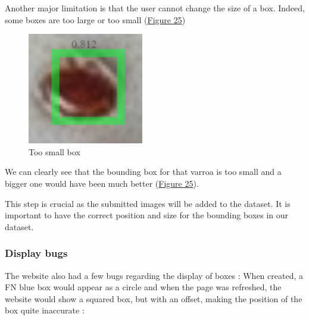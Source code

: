 \documentclass{article}
\begin{document}
Another major limitation is that the user cannot change the size of a box. Indeed, some boxes are too large or too small (\hyperref[Figure 25]{Figure 25})

\begin{figure}[!ht]
  \centering
  \includegraphics[scale=0.9]{limitation/small.PNG}
  \caption{Too small box}
  \label{Figure 25}
\end{figure}

We can clearly see that the bounding box for that varroa is too small and a bigger one would have been much better (\hyperref[Figure 25]{Figure 25}).

\bigskip

This step is crucial as the submitted images will be added to the dataset. It is important to have the correct position and size for the bounding boxes in our dataset.

\subsubsection{Display bugs}

The website also had a few bugs regarding the display of boxes : When created, a FN blue box would appear as a circle and when the page was refreshed, the website would show a squared box, but with an offset, making the position of the box quite inaccurate : 
\end{document}
